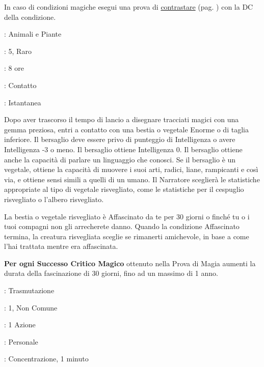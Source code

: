 \begin{multicols}{2}
In caso di condizioni magiche esegui una prova di \hyperlink{contrastareincantesimi}{contrastare} (pag. \pageref{contrastareincantesimi}) con la DC della condizione.

\noindent\colorbox{OBSSgold!10}{
\begin{minipage}{0.95\linewidth}
\begin{description}[noitemsep, topsep=0pt, parsep=0pt, partopsep=0pt, leftmargin=0cm, labelwidth=1.3cm]
	\item[\textbf{Lista}]: Animali e Piante
	\item[\textbf{Livello}]: 5, Raro
	\item[\textbf{Lancio}]: 8 ore
	\item[\textbf{Gittata}]: Contatto
	\item[\textbf{Durata}]: Istantanea
\end{description}
\end{minipage}}\smallskip

Dopo aver trascorso il tempo di lancio a disegnare tracciati magici con una gemma preziosa, entri a contatto con una bestia o vegetale Enorme o di taglia inferiore. Il bersaglio deve essere privo di punteggio di Intelligenza o avere Intelligenza -3 o meno. Il bersaglio ottiene Intelligenza 0. Il bersaglio ottiene anche la capacità di parlare un linguaggio che conosci. Se il bersaglio è un vegetale, ottiene la capacità di muovere i suoi arti, radici, liane, rampicanti e così via, e ottiene sensi simili a quelli di un umano. Il Narratore sceglierà le statistiche appropriate al tipo di vegetale risvegliato, come le statistiche per il cespuglio risvegliato o l'albero risvegliato.

La bestia o vegetale risvegliato è Affascinato da te per 30 giorni o finché tu o i tuoi compagni non gli arrecherete danno. Quando la condizione Affascinato termina, la creatura risvegliata sceglie se rimanerti amichevole, in base a come l'hai trattata mentre era affascinata.

\textbf{Per ogni Successo Critico Magico} ottenuto nella Prova di Magia aumenti la durata della fascinazione di 30 giorni, fino ad un massimo di 1 anno.

\noindent\colorbox{OBSSgold!10}{
\begin{minipage}{0.95\linewidth}
\begin{description}[noitemsep, topsep=0pt, parsep=0pt, partopsep=0pt, leftmargin=0cm, labelwidth=1.3cm]
	\item[\textbf{Lista}]: Trasmutazione
	\item[\textbf{Livello}]: 1, Non Comune
	\item[\textbf{Lancio}]: 1 Azione
	\item[\textbf{Gittata}]: Personale
	\item[\textbf{Durata}]: Concentrazione, 1 minuto
\end{description}
\end{minipage}}\smallskip


\end{multicols}
